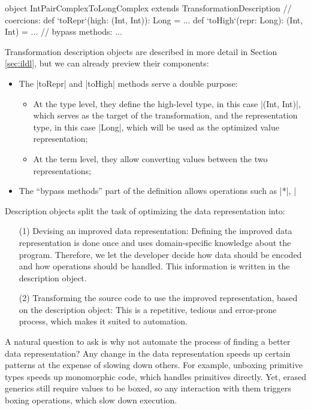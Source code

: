 \begin{lstlisting-nobreak}
object IntPairComplexToLongComplex
          extends TransformationDescription {
  // coercions:
  def `toRepr`(high: (Int, Int)): Long = ...
  def `toHigh`(repr: Long): (Int, Int) = ...
  // bypass methods:
  ...
}
\end{lstlisting-nobreak}

\noindent
Transformation description objects are described in more detail in Section \ref{sec:ildl}, but we can already preview their components:
\begin{itemize}
  \item The |toRepr| and |toHigh| methods serve a double purpose:
  \begin{itemize}
    \item At the type level, they define the high-level type, in this case |(Int, Int)|, which serves as the target of the transformation, and the representation type, in this case |Long|, which will be used as the optimized value representation;
    \item At the term level, they allow converting values between the two representations;
  \end{itemize}
  \item The ``bypass methods'' part of the definition allows operations such as |*|, |%
\end{itemize}

Description objects split the task of optimizing the data representation into:
\begin{itemize}
\item[(1)] Devising an improved data representation: Defining the improved data representation is done once and uses domain-specific knowledge about the program. Therefore, we let the developer decide how data should be encoded and how operations should be handled. This information is written in the description object.
\item[(2)] Transforming the source code to use the improved representation, based on the description object: This is a repetitive, tedious and error-prone process, which makes it suited to automation.
\end{itemize}

A natural question to ask is why not automate the process of finding a better data representation? Any change in the data representation speeds up certain patterns at the expense of slowing down others. For example, unboxing primitive types speeds up monomorphic code, which handles primitives directly. Yet, erased generics still require values to be boxed, so any interaction with them triggers boxing operations, which slow down execution. %

